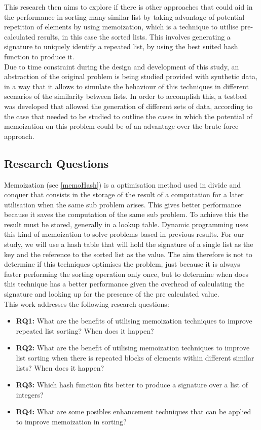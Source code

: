 \documentclass[a4paper,12pt]{article}
\begin{document}
This research then aims to explore if there is other approaches that could aid in the performance in sorting many similar list by taking advantage of potential repetition of elements by using memoization, which is a technique to utilise pre-calculated results, in this case the sorted lists. This involves generating a signature to uniquely identify a repeated list, by using the best suited hash function to produce it.
\\

Due to time constraint during the design and development of this study, an abstraction of the original problem is being studied provided with synthetic data, in a way that it allows to simulate the behaviour of this techniques in different scenarios of the similarity between lists. In order to accomplish this, a testbed was developed that allowed the generation of different sets of data, according to the case that needed to be studied to outline the cases in which the potential of memoization on this problem could be of an advantage over the brute force approach.

\subsection*{Research Questions}
Memoization (see \ref{memoHash}) is a optimisation method used in divide and conquer that consists in the storage of the result of a computation for a later utilisation when the same sub problem arises. This gives better performance because it saves the computation of the same sub problem. To achieve this the result must be stored, generally in a lookup table. Dynamic programming uses this kind of memoization to solve problems based in previous results. For our study, we will use a hash table that will hold the signature of a single list as the key and the reference to the sorted list as the value. The aim therefore is not to determine if this techniques optimises the problem, just because it is always faster performing the sorting operation only once, but to determine when does this technique has a better performance given the overhead of calculating the signature and looking up for the presence of the pre calculated value.\\

This work addresses the following research questions:

\begin{itemize}
\item {\bf RQ1:} What are the benefits of utilising memoization techniques to improve repeated list sorting? When does it happen?
\item {\bf RQ2:} What are the benefit of utilising memoization techniques to improve list sorting when there is repeated blocks of elements within different similar lists? When does it happen?
\item {\bf RQ3:} Which hash function fits better to produce a signature over a list of integers?
\item {\bf RQ4:} What are some posibles enhancement techniques that can be applied to improve memoization in sorting?
\end{itemize}
\end{document}
